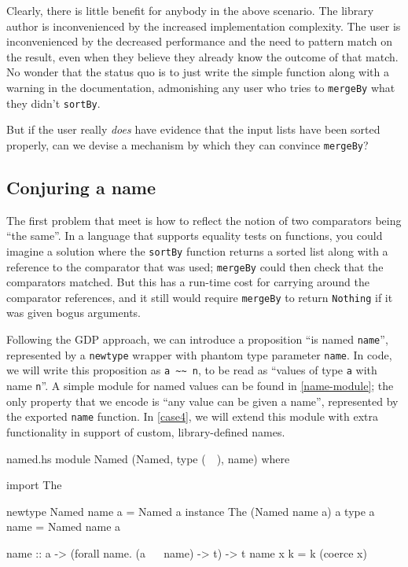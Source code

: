 \documentclass[format=sigplan, review=false, screen=true]{acmart}
\begin{document}
Clearly, there is little benefit for anybody in the above scenario. The
library author is inconvenienced by the increased implementation complexity.
The user is inconvenienced by the decreased performance and the need to
pattern match on the result, even when they believe they already know the
outcome of that match. No wonder that the status quo is to just write
the simple function along with a warning in the documentation, admonishing
any user who tries to \texttt{mergeBy} what they didn't \texttt{sortBy}.

But if the user really \emph{does} have evidence that the input lists have
been sorted properly, can we devise a mechanism by which they can convince
\texttt{mergeBy}?

\subsection{Conjuring a name}
The first problem that meet is how to reflect the notion of two  comparators
being ``the same''. In a language that supports equality tests on functions,
you could imagine a solution where the \texttt{sortBy} function returns a sorted
list along with a reference to the comparator that was used; \texttt{mergeBy} could
then check that the comparators matched. But this has a run-time cost for carrying
around the comparator references, and it still would require \texttt{mergeBy} to
return \texttt{Nothing} if it was given bogus arguments.

Following the GDP approach, we can introduce a proposition ``is named \texttt{name}'',
represented by a \texttt{newtype} wrapper with phantom type parameter \texttt{name}.
In code, we will write this proposition as \verb|a ~~ n|, to be read as
``values of type \texttt{a} with name \texttt{n}''. A simple module for named values
can be found in \cref{name-module}; the only property that we encode is
``any value can be given a name'', represented by the exported \texttt{name} function.
In \cref{case4}, we will extend this module with extra functionality in support of
custom, library-defined names.


\begin{filecontents*}{named.hs}
module Named (Named, type (~~), name) where

import The

newtype Named name a = Named a
instance The (Named name a) a
type a ~~ name = Named name a

name :: a -> (forall name. (a ~~ name) -> t) -> t
name x k = k (coerce x)
\end{filecontents*}
\end{document}
